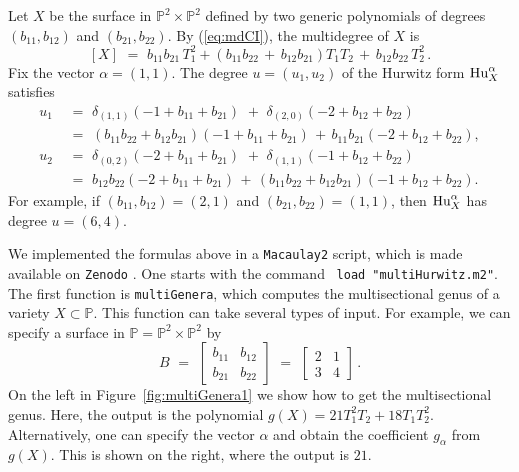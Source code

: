 \documentclass[12pt]{article}
\theoremstyle{definition}
\newenvironment{example}
{\pushQED{\qed}\renewcommand{\qedsymbol}{$\diamond$}\examplex}
{\popQED\endexamplex}
\newcommand{\bP}{\mathbb P}
\begin{document}
\begin{example}[$\ell = n_1 = n_2 = 2$]
Let $X$ be the surface in $\bP^2 \times \bP^2$ defined by two generic polynomials of
degrees $(b_{11},b_{12})$ and $(b_{21},b_{22})$. By (\ref{eq:mdCI}), the multidegree of $X$ is
   \[ [X] \,\,=\,\, b_{11}b_{21}\,T_1^2+(b_{11}b_{22}\,+\,b_{12}b_{21})T_1T_2\,+\,b_{12}b_{22}\,T_2^2\,.   \]
    Fix the vector $\alpha=(1,1)$. The degree $u=(u_1,u_2)$ of the Hurwitz form ${\rm Hu}^\alpha_X$ satisfies
        \begin{align*}
        u_1 &\,\,=\,\, \delta_{(1,1)}(-1+b_{11}+b_{21})\,\,+\,\,\delta_{(2,0)}(-2+b_{12}+b_{22})\\
        &\,\,=\,\, (b_{11}b_{22}+b_{12}b_{21})(-1+b_{11}+b_{21})\,+\,b_{11}b_{21}(-2+b_{12}+b_{22}),\\
        u_2 &\,\,=\,\, \delta_{(0,2)}(-2+b_{11}+b_{21})\,\,+\,\,\delta_{(1,1)}(-1+b_{12}+b_{22})\\
        &\,\,= \,\,b_{12}b_{22}(-2+b_{11}+b_{21})\,+\,(b_{11}b_{22}+b_{12}b_{21})(-1+b_{12}+b_{22}).
    \end{align*}
    For example, if $(b_{11},b_{12})=(2,1)$ and $(b_{21},b_{22})=(1,1)$, then 
    ${\rm Hu}^\alpha_X$ has degree $u=(6,4)$.
\end{example}

We implemented the formulas above in a {\tt Macaulay2} script, which is
 made available on {\tt Zenodo} \cite{zenodo}. One starts with the command \
 {\tt load "multiHurwitz.m2"}.
The first function is {\tt multiGenera},
which computes the multisectional genus of a variety $X\subset\bP$. This function can take several types of input. For example, we can specify a surface in $\bP=\bP^2\times\bP^2$ by
\[
    B \,\,=\,\, \begin{bmatrix} b_{11} & b_{12} \\ b_{21} & b_{22} \end{bmatrix} \,\,=\,\,
    \begin{bmatrix}
    2&1\\3&4    
    \end{bmatrix}\,.
\]
On the left in  Figure~\ref{fig:multiGenera1} we show how to get the multisectional genus. 
Here, the output is the polynomial $g(X)=21T_1^2T_2+18T_1T_2^2$.  Alternatively, one 
can specify the vector $\alpha$ and obtain the coefficient $g_\alpha$ from $g(X)$. 
This is shown on the right, where the output is $21$.

\medskip
\end{document}
